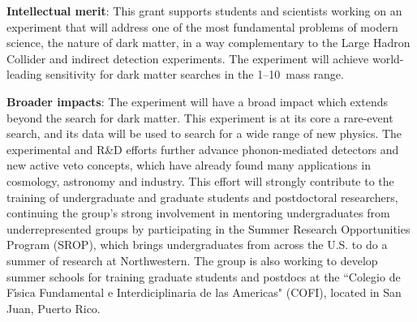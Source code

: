 \textbf{Intellectual merit}: This grant supports students and scientists working on an experiment that will address one of the most fundamental problems of modern science, the nature of dark matter, in a way complementary to the Large Hadron Collider and indirect detection experiments. The \scs experiment will achieve world-leading sensitivity for dark matter searches in the 1--10~\gev mass range. %

\textbf{Broader impacts}: The \scs experiment will have a broad impact which extends beyond the search for dark matter. This experiment is at its core a rare-event search, and its data will be used to search for a wide range of new physics. The experimental and R\&D efforts further advance phonon-mediated detectors and new active veto concepts, which have already found many applications in cosmology, astronomy and industry. This effort will strongly contribute to the training of undergraduate and graduate students and postdoctoral researchers, continuing the group's strong involvement in mentoring undergraduates from underrepresented groups by participating in the Summer Research Opportunities Program (SROP), which brings undergraduates from across the U.S. to do a summer of research at Northwestern. The group is also working to develop summer schools for training graduate students and postdocs at the ``Colegio de F\'{\i}sica Fundamental e Interdiciplinaria de las Americas" (COFI), located in San Juan, Puerto Rico.

